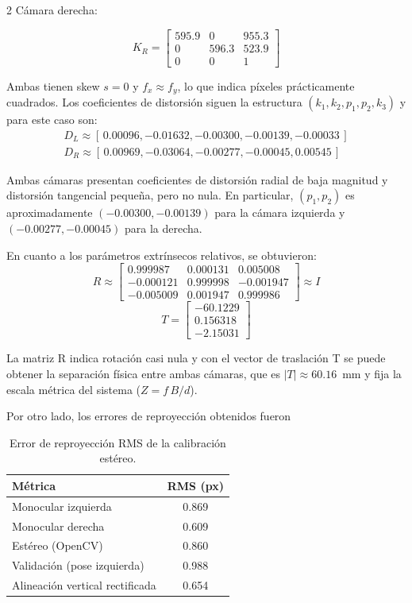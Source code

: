 \documentclass[10pt,a4paper]{article}
\begin{document}
\begin{multicols}{2}
Cámara derecha:

$$K_R = \begin{bmatrix} 595.9 & 0 & 955.3 \\ 0 & 596.3 & 523.9 \\ 0 & 0 & 1 \end{bmatrix}$$

Ambas tienen skew $s = 0$ y $f_x \approx f_y$, lo que indica píxeles prácticamente cuadrados.
Los coeficientes de distorsión siguen la estructura $(k_1, k_2, p_1, p_2, k_3)$ y para este caso
son:
{\small
\begin{gather*}
D_L \approx [\,0.00096, -0.01632, -0.00300, -0.00139, -0.00033\,] \\
D_R \approx [\,0.00969, -0.03064, -0.00277, -0.00045, 0.00545\,]
\end{gather*}
}

Ambas cámaras presentan coeficientes de distorsión radial de baja magnitud y distorsión
tangencial pequeña, pero no nula. En particular, $(p_1,p_2)$ es aproximadamente
$(-0.00300,-0.00139)$ para la cámara izquierda y $(-0.00277,-0.00045)$ para la derecha.

En cuanto a los parámetros extrínsecos relativos, se obtuvieron:
$$R \approx \begin{bmatrix} 0.999987 & 0.000131 & 0.005008 \\ -0.000121 & 0.999998 & -0.001947 \\ -0.005009 & 0.001947 & 0.999986 \end{bmatrix} \approx I$$
$$ T = \begin{bmatrix} -60.1229 \\ 0.156318 \\ -2.15031 \end{bmatrix}$$

La matriz R indica rotación casi nula y con el vector de traslación T se puede obtener la separación física entre
ambas cámaras, que es $|T| \approx 60.16$~mm y fija la escala métrica del sistema ($Z = f\,B/d$).

Por otro lado, los errores de reproyección obtenidos fueron

\begin{table}[H]
\centering
\caption{Error de reproyección RMS de la calibración estéreo.}
\label{tab:rms_calibracion}
\begin{tabular}{lc}
\toprule
\textbf{Métrica} & \textbf{RMS (px)} \\
\midrule
Monocular izquierda          & 0.869 \\
Monocular derecha            & 0.609 \\
Estéreo (OpenCV)             & 0.860 \\
Validación (pose izquierda)  & 0.988 \\
Alineación vertical rectificada & 0.654 \\
\bottomrule
\end{tabular}
\end{table}


\end{multicols}
\end{document}
